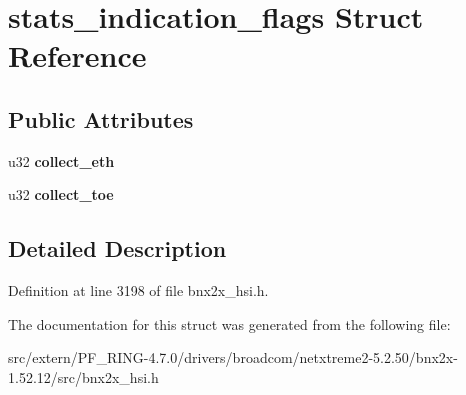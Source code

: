 \hypertarget{structstats__indication__flags}{
\section{stats\_\-indication\_\-flags Struct Reference}
\label{structstats__indication__flags}
}
\subsection*{Public Attributes}
\begin{DoxyCompactItemize}
\item 
\hypertarget{structstats__indication__flags_a31ccaf9cd3d662df196385ced6712318}{
u32 {\bfseries collect\_\-eth}}
\label{structstats__indication__flags_a31ccaf9cd3d662df196385ced6712318}

\item 
\hypertarget{structstats__indication__flags_a9d8bb225f800027fbc1c70c0d66203fb}{
u32 {\bfseries collect\_\-toe}}
\label{structstats__indication__flags_a9d8bb225f800027fbc1c70c0d66203fb}

\end{DoxyCompactItemize}


\subsection{Detailed Description}


Definition at line 3198 of file bnx2x\_\-hsi.h.



The documentation for this struct was generated from the following file:\begin{DoxyCompactItemize}
\item 
src/extern/PF\_\-RING-\/4.7.0/drivers/broadcom/netxtreme2-\/5.2.50/bnx2x-\/1.52.12/src/bnx2x\_\-hsi.h\end{DoxyCompactItemize}

